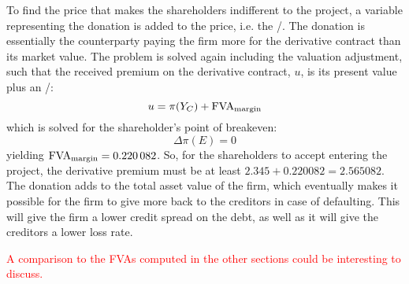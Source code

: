 \documentclass[../main.tex]{subfiles}
\begin{document}
        To find the price that makes the shareholders indifferent to the project,
        a variable representing the donation is added to the price, i.e. the \MVA/.
        The donation is essentially the counterparty paying the firm more for the derivative contract than its market value.
        The problem is solved again including the valuation adjustment,
        such that the received premium on the derivative contract, $u$, is its present value plus an \MVA/:
        \begin{equation}
            u = \pi(Y_C) + \MVA/
        \end{equation}
        which is solved for the shareholder's point of breakeven:
        \begin{equation}
            \Delta \pi(E) = 0
        \end{equation}
        yielding $\MVA/ = \num{0.220082}$. So, for the shareholders to accept entering the project, the derivative premium must be at least $\num{2.345} + \num{0.220082} = \num{2.565082}$.
        The donation adds to the total asset value of the firm,
        which eventually makes it possible for the firm to give more back to the creditors in case of defaulting.
        This will give the firm a lower credit spread on the debt, as well as it will give the creditors a lower loss rate.

        \textcolor{red}{A comparison to the FVAs computed in the other sections could be interesting to discuss.}
        
\end{document}
